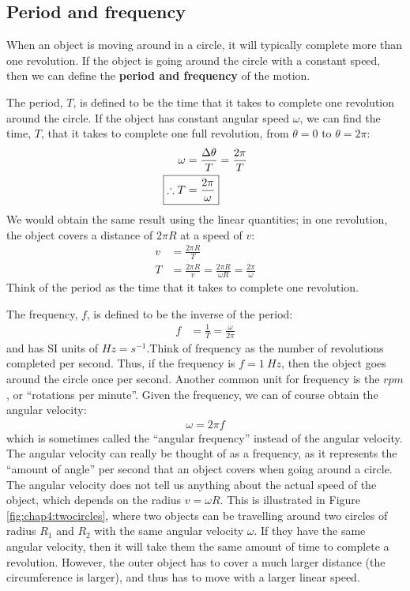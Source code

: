 \subsection{Period and frequency}
When an object is moving around in a circle, it will typically complete more than one revolution. If the object is going around the circle with a constant speed, then we can define the \textbf{period and frequency} of the motion. 

The period, $T$, is defined to be the time that it takes to complete one revolution around the circle. If the object has constant angular speed $\omega$, we can find the time, $T$, that it takes to complete one full revolution, from $\theta=0$ to $\theta=2\pi$:
\begin{align}
\omega&=\frac{\Delta \theta}{T}=\frac{2\pi}{T}\nonumber\\
\Aboxed{\therefore T&=\frac{2\pi}{\omega}}
\end{align}
We would obtain the same result using the linear quantities; in one revolution, the object covers a distance of $2\pi R$ at a speed of $v$:
\begin{align*}
v&=\frac{2\pi R}{T}\\
T&=\frac{2\pi R}{v}=\frac{2\pi R}{\omega R}=\frac{2\pi}{\omega}
\end{align*}
Think of the period as the time that it takes to complete one revolution.

The frequency, $f$, is defined to be the inverse of the period:
\begin{align*}
f&=\frac{1}{T}=\frac{\omega}{2\pi}
\end{align*}
and has SI units of $\si{Hz}=\si{s^{-1}}$.Think of frequency as the number of revolutions completed per second. Thus, if the frequency is $f=\SI{1}{Hz}$, then the object goes around the circle once per second. 
Another common unit for frequency is the $\si{rpm}$, or ``rotations per minute''. Given the frequency, we can of course obtain the angular velocity:
\begin{align*}
\omega = 2\pi f
\end{align*}
which is sometimes called the ``angular frequency'' instead of the angular velocity. The angular velocity can really be thought of as a frequency, as it represents the ``amount of angle'' per second that an object covers when going around a circle. The angular velocity does not tell us anything about the actual speed of the object, which depends on the radius $v=\omega R$. This is illustrated in Figure \ref{fig:chap4:twocircles}, where two objects can be travelling around two circles of radius $R_1$ and $R_2$ with the same angular velocity $\omega$. If they have the same angular velocity, then it will take them the same amount of time to complete a revolution. However, the outer object has to cover a much larger distance (the circumference is larger), and thus has to move with a larger linear speed.

